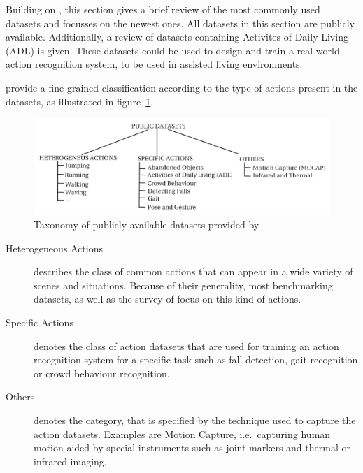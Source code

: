 Building on \cite{chaquet_survey_2013}, this section gives a brief review of the most commonly used datasets and focusses on the newest ones.
All datasets in this section are publicly available.
Additionally, a review of datasets containing Activites of Daily Living (ADL) is given.
These datasets could be used to design and train a real-world action recognition system, to be used in assisted living environments.

\textcite{chaquet_survey_2013} provide a fine-grained classification according to the type of actions present in the datasets, as illustrated in figure~\ref{fig:datasetssurvey_taxonomy}.
\begin{figure}[H]
    \centering
    \includegraphics[width=\textwidth]{img_datasets/datasetssurvey_taxonomy}
    \caption{Taxonomy of publicly available datasets provided by \cite{chaquet_survey_2013}}
    \label{fig:datasetssurvey_taxonomy}
\end{figure}
\begin{description}
    \item[Heterogeneous Actions] describes the class of common actions that can appear in a wide variety of scenes and situations.
        Because of their generality, most benchmarking datasets, as well as the survey of \textcite{chaquet_survey_2013} focus on this kind of actions.
    \item[Specific Actions] denotes the class of action datasets that are used for training an action recognition system for a specific task such as fall detection, gait recognition or crowd behaviour recognition.
    \item[Others] denotes the category, that is specified by the technique used to capture the action datasets. Examples are Motion Capture, i.e.\ capturing human motion aided by special instruments such as joint markers and thermal or infrared imaging.
\end{description}


